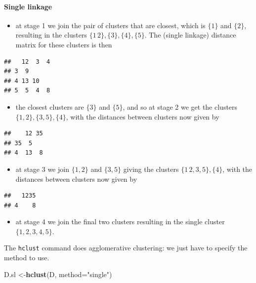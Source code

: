 \documentclass[
]{book}
\newenvironment{Shaded}{\begin{snugshade}}{\end{snugshade}}
\newcommand{\AttributeTok}[1]{\textcolor[rgb]{0.13,0.29,0.53}{#1}}
\newcommand{\FunctionTok}[1]{\textcolor[rgb]{0.13,0.29,0.53}{\textbf{#1}}}
\newcommand{\NormalTok}[1]{#1}
\newcommand{\OtherTok}[1]{\textcolor[rgb]{0.56,0.35,0.01}{#1}}
\newcommand{\StringTok}[1]{\textcolor[rgb]{0.31,0.60,0.02}{#1}}
\providecommand{\tightlist}{%
  \setlength{\itemsep}{0pt}\setlength{\parskip}{0pt}}
\theoremstyle{definition}
\theoremstyle{definition}
\theoremstyle{definition}
\theoremstyle{definition}
\theoremstyle{remark}
\begin{document}
\paragraph*{Single linkage}\label{single-linkage}

\begin{itemize}
\tightlist
\item
  at stage 1 we join the pair of clusters that are closest, which is \(\{1\}\) and \(\{2\}\), resulting in the clusters \(\{1\, 2\},\{3\},\{4\},\{5\}\). The (single linkage) distance matrix for these clusters is then
\end{itemize}

\begin{verbatim}
##   12  3  4
## 3  9      
## 4 13 10   
## 5  5  4  8
\end{verbatim}

\begin{itemize}
\tightlist
\item
  the closest clusters are \(\{3\}\) and \(\{5\}\), and so at stage 2
  we get the clusters \(\{1, 2\},\{3, 5\},\{4\}\), with the distances between clusters now given by
\end{itemize}

\begin{verbatim}
##    12 35
## 35  5   
## 4  13  8
\end{verbatim}

\begin{itemize}
\tightlist
\item
  at stage 3 we join \(\{1, 2\}\) and \(\{3, 5\}\) giving the clusters \(\{1\, 2, 3, 5\},\{4\}\), with the distances between clusters now given by
\end{itemize}

\begin{verbatim}
##   1235
## 4    8
\end{verbatim}

\begin{itemize}
\tightlist
\item
  at stage 4 we join the final two clusters resulting in the single cluster \(\{1, 2, 3, 4, 5\}\).
\end{itemize}

The \texttt{hclust} command does agglomerative clustering: we just have to specify the method to use.

\begin{Shaded}
\begin{Highlighting}[]
\NormalTok{D.sl }\OtherTok{\textless{}{-}}\FunctionTok{hclust}\NormalTok{(D, }\AttributeTok{method=}\StringTok{"single"}\NormalTok{)}
\end{Highlighting}
\end{Shaded}
\end{document}
